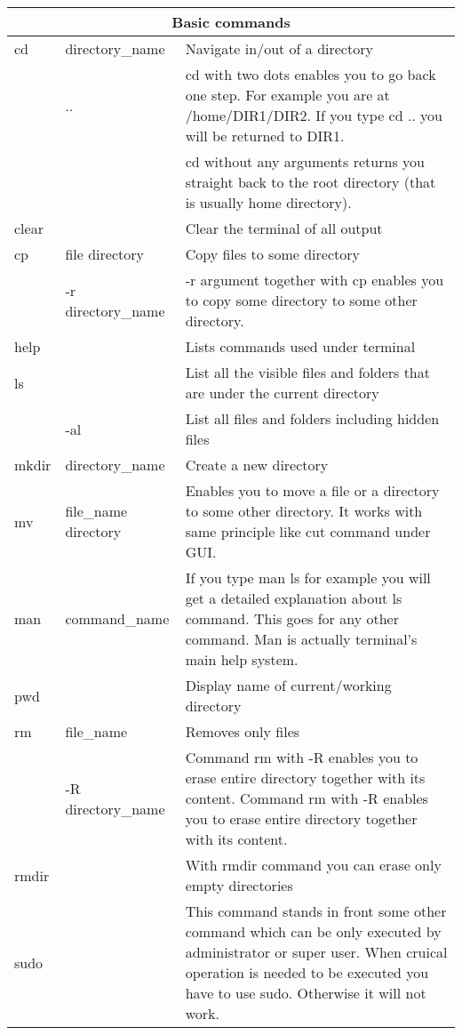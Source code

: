 \begin{table}[h]
	\centering
	\begin{tabular}{|l|l|p{11cm}|}
	\hline
	\multicolumn{3}{|c|}{\textbf{Basic commands}} \\
 	\hline
 	cd & directory\_name & Navigate in/out of a  directory\\
 	& .. & cd with two dots enables you to go back one step. For example you are at /home/DIR1/DIR2. If you type cd .. you will be returned to DIR1. \\
	& & cd without any arguments returns you straight back to the root directory (that is usually home directory). \\
    \hline
    clear & & Clear the terminal of all output \\
    \hline
    
    cp & file directory & Copy files  to some directory \\
    & -r  directory\_name & -r argument together with cp enables you to copy some directory to some other directory. \\
	\hline
	help & & Lists commands used under terminal \\
	\hline
	ls & & List all the visible files and folders that are under the current directory \\        
 	& -al & List all files and folders including hidden files\\
 	\hline
 	mkdir & directory\_name & Create a new directory \\
 	\hline
 	mv & file\_name directory & Enables you to move a file or a directory to some other directory. It works with same principle like cut command under GUI.  \\
 	\hline
 	man & command\_name & If you type man ls for example you will get a detailed explanation about ls command. This goes for any other command. Man is actually terminal's main help system. \\
 	\hline
 	pwd & & Display name of current/working directory \\
	\hline
	rm & file\_name & Removes only files \\
	& -R  directory\_name & Command rm with -R enables you to erase entire directory together with its content. Command rm with -R enables you to erase entire directory together with its content. \\
	\hline
	rmdir & & With rmdir command you can erase only empty directories \\
	\hline
	sudo & & This command stands in front some other command which can be only executed by administrator or super user. When cruical operation is needed to be executed you have to use sudo. Otherwise it will not work. \\
	

\end{tabular}
\end{table}
